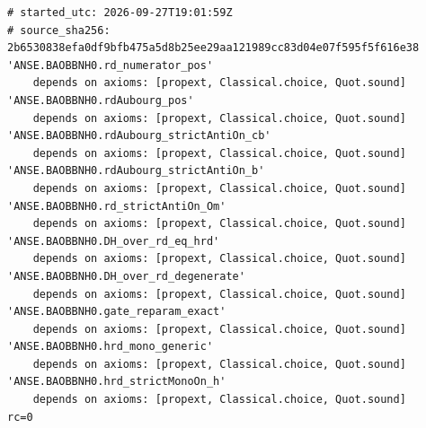 \begin{verbatim}
# started_utc: 2026-09-27T19:01:59Z
# source_sha256: 2b6530838efa0df9bfb475a5d8b25ee29aa121989cc83d04e07f595f5f616e38
'ANSE.BAOBBNH0.rd_numerator_pos'
    depends on axioms: [propext, Classical.choice, Quot.sound]
'ANSE.BAOBBNH0.rdAubourg_pos'
    depends on axioms: [propext, Classical.choice, Quot.sound]
'ANSE.BAOBBNH0.rdAubourg_strictAntiOn_cb'
    depends on axioms: [propext, Classical.choice, Quot.sound]
'ANSE.BAOBBNH0.rdAubourg_strictAntiOn_b'
    depends on axioms: [propext, Classical.choice, Quot.sound]
'ANSE.BAOBBNH0.rd_strictAntiOn_Om'
    depends on axioms: [propext, Classical.choice, Quot.sound]
'ANSE.BAOBBNH0.DH_over_rd_eq_hrd'
    depends on axioms: [propext, Classical.choice, Quot.sound]
'ANSE.BAOBBNH0.DH_over_rd_degenerate'
    depends on axioms: [propext, Classical.choice, Quot.sound]
'ANSE.BAOBBNH0.gate_reparam_exact'
    depends on axioms: [propext, Classical.choice, Quot.sound]
'ANSE.BAOBBNH0.hrd_mono_generic'
    depends on axioms: [propext, Classical.choice, Quot.sound]
'ANSE.BAOBBNH0.hrd_strictMonoOn_h'
    depends on axioms: [propext, Classical.choice, Quot.sound]
rc=0
\end{verbatim}
